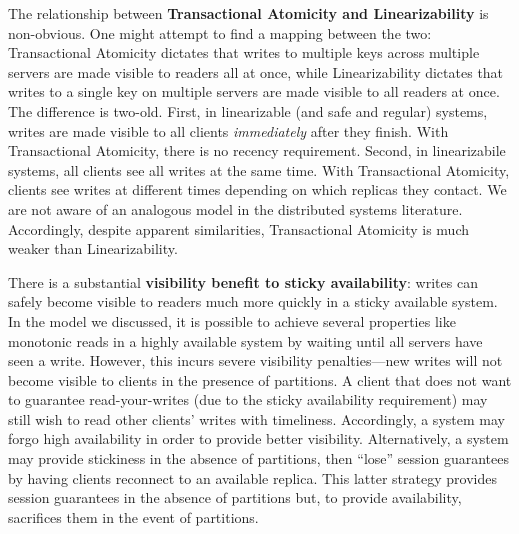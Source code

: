 \noindent The relationship between \textbf{Transactional Atomicity and
  Linearizability} is non-obvious. One might attempt to find a mapping
between the two: Transactional Atomicity dictates that writes to
multiple keys across multiple servers are made visible to readers all
at once, while Linearizability dictates that writes to a single key on
multiple servers are made visible to all readers at once. The
difference is two-old. First, in linearizable (and safe and regular)
systems, writes are made visible to all clients \textit{immediately}
after they finish. With Transactional Atomicity, there is no recency
requirement. Second, in linearizabile systems, all clients see all
writes at the same time. With Transactional Atomicity, clients see
writes at different times depending on which replicas they contact. We
are not aware of an analogous model in the distributed systems
literature. Accordingly, despite apparent similarities, Transactional
Atomicity is much weaker than Linearizability.

\noindent There is a substantial \textbf{visibility benefit to sticky
  availability}: writes can safely become visible to readers much more
quickly in a sticky available system. In the model we discussed, it is
possible to achieve several properties like monotonic reads in a
highly available system by waiting until all servers have seen a
write. However, this incurs severe visibility penalties---new writes
will not become visible to clients in the presence of partitions. A
client that does not want to guarantee read-your-writes (due to the
sticky availability requirement) may still wish to read other clients'
writes with timeliness. Accordingly, a system may forgo high
availability in order to provide better visibility. Alternatively, a
system may provide stickiness in the absence of partitions, then
``lose'' session guarantees by having clients reconnect to an
available replica. This latter strategy provides session guarantees in
the absence of partitions but, to provide availability, sacrifices
them in the event of partitions.

